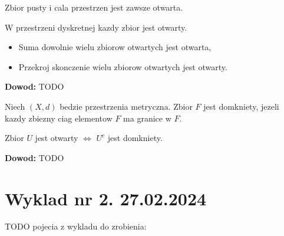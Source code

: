 \documentclass{article}
\begin{document}
Zbior pusty i cala przestrzen jest zawsze otwarta. 

W przestrzeni dyskretnej kazdy zbior jest otwarty.

\begin{tcolorbox}[colback=white!90!green,colframe=black!35!green,title=Fakt 1.8: Sumy i przekroje zbiorow otwartych.]
\begin{itemize}
    \item Suma dowolnie wielu zbiorow otwartych jest otwarta,
    \item Przekroj skonczenie wielu zbiorow otwartych jest otwarty.
\end{itemize}
\end{tcolorbox}
\textbf{Dowod:} TODO

\begin{tcolorbox}[colback=white!90!red,colframe=black!35!red,title=Definicja 1.9: Zbior domkniety.]

    Niech $(X,d)$ bedzie przestrzenia metryczna. Zbior $F$ jest domkniety, jezeli kazdy zbiezny ciag elementow $F$ ma granice w $F$.
\end{tcolorbox}

\begin{tcolorbox}[colback=white!90!green,colframe=black!35!green,title=Fakt 1.10: Zbior domkniety kiedy]
    
    Zbior $U$ jest otwarty $\iff$ $U^{c}$ jest domkniety.
\end{tcolorbox}

\textbf{Dowod:} TODO
\section{Wyklad nr 2. 27.02.2024}

TODO pojecia z wykladu do zrobienia:
\end{document}
